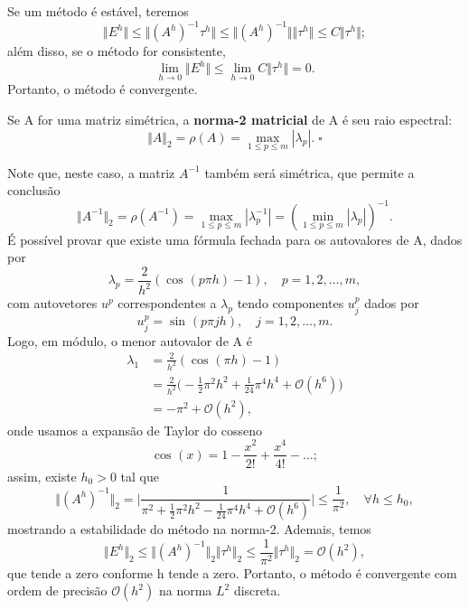 \documentclass[../differential_methods.tex]{subfiles}
\begin{document}
\begin{proof*}
	Se um método é estável, teremos
	\[
		\Vert E^{h} \Vert \leq \Vert (A^{h})^{-1}\tau^{h} \Vert \leq \Vert (A^{h})^{-1} \Vert \Vert \tau^{h} \Vert \leq C\Vert \tau^{h} \Vert;
	\]
	além disso, se o método for consistente,
	\[
		\lim_{h\to 0}\Vert E^{h} \Vert \leq \lim_{h\to 0}C\Vert \tau^{h} \Vert =0.
	\]
	Portanto, o método é convergente. \qedsymbol
\end{proof*}
\begin{def*}
	Se A for uma matriz simétrica, a \textbf{norma-2 matricial} de A é seu raio espectral:
	\[
		\Vert A \Vert_{2} = \rho (A)=\max\limits_{1\leq p\leq m}| \lambda_{p} |. \; \square
	\]
\end{def*}
Note que, neste caso, a matriz \(A^{-1}\) também será simétrica, que permite a conclusão
\[
	\Vert A^{-1} \Vert_{2}=\rho (A^{-1}) = \max\limits_{1\leq p\leq m}| \lambda_{p}^{-1} | = (\min\limits_{1\leq p \leq m}| \lambda_{p} |)^{-1}.
\]
É possível provar que existe uma fórmula fechada para os autovalores de A, dados por
\[
	\lambda_{p} = \frac{2}{h^{2}}(\cos^{}{(p\pi h)}-1),\quad p=1,2,\dotsc ,m,
\]
com autovetores \(u^{p}\) correspondentes a \(\lambda_{p}\) tendo componentes \(u_{j}^{p}\) dados por
\[
	u_{j}^{p} = \sin^{}{(p\pi jh)}, \quad j=1,2,\dotsc ,m.
\]
Logo, em módulo, o menor autovalor de A é
\begin{align*}
	\lambda_{1} & = \frac{2}{h^{2}}(\cos^{}{(\pi h)}-1)                                                                 \\
	            & = \frac{2}{h^{2}}\biggl(-\frac{1}{2}\pi^{2}h^{2} + \frac{1}{24}\pi^{4}h^{4}+\mathcal{O}(h^{6})\biggr) \\
	            & = -\pi^{2} + \mathcal{O}(h^{2}),
\end{align*}
onde usamos a expansão de Taylor do cosseno
\[
	\cos^{}{(x)} = 1- \frac{x^{2}}{2!} + \frac{x^{4}}{4!} - \dotsc;
\]
assim, existe \(h_{0}>0\) tal que
\[
	\Vert (A^{h})^{-1} \Vert_{2} = \biggl\vert \frac{1}{\pi^{2}+\frac{1}{2}\pi^{2}h^{2} - \frac{1}{24}\pi^{4}h^{4}+\mathcal{O}(h^{6})} \biggr\vert \leq \frac{1}{\pi^{2}}, \quad \forall h\leq h_{0},
\]
mostrando a estabilidade do método na norma-2. Ademais, temos
\[
	\Vert E^{h} \Vert_{2} \leq \Vert (A^{h})^{-1} \Vert_{2} \Vert \tau^{h} \Vert_{2} \leq \frac{1}{\pi^{2}} \Vert \tau^{h} \Vert_{2} = \mathcal{O}(h^{2}),
\]
que tende a zero conforme h tende a zero. Portanto, o método é convergente com ordem de precisão \(\mathcal{O}(h^{2})\) na norma \(L^{2}\) discreta.
\end{document}
